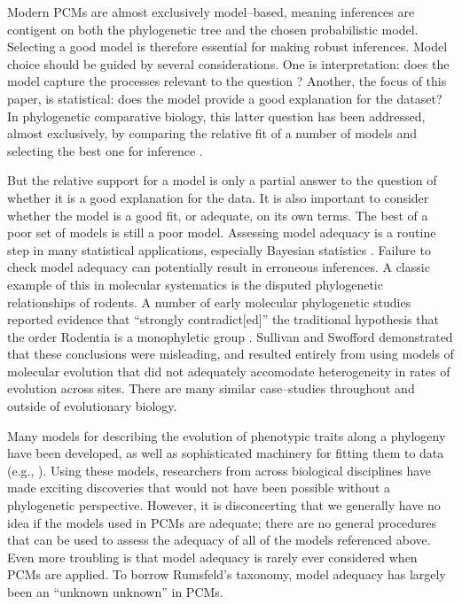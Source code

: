 \documentclass[a4paper,12pt]{article}
\begin{document}
Modern PCMs are almost exclusively model--based, meaning inferences are contigent on both the phylogenetic tree and the chosen probabilistic model. Selecting a good model is therefore essential for making robust inferences. Model choice should be guided by several considerations. One is interpretation: does the model capture the processes relevant to the question \citep{HansenOrzack2005, Hansen2012, PennellPE}? Another, the focus of this paper, is statistical: does the model provide a good explanation for the dataset? In phylogenetic comparative biology, this latter question has been addressed, almost exclusively, by comparing the relative fit of a number of models and selecting the best one for inference \citep{Mooers1999, Harmon2010, Hunt2012}. 

But the relative support for a model is only a partial answer to the question of whether it is a good explanation for the data. It is also important to consider whether the model is a good fit, or adequate, on its own terms. The best of a poor set of models is still a poor model. Assessing model adequacy is a routine step in many statistical applications, especially Bayesian statistics \citep{Gelmanbook}. Failure to check model adequacy can potentially result in erroneous inferences. A classic example of this in molecular systematics is the disputed phylogenetic relationships of rodents. A number of early molecular phylogenetic studies reported evidence that ``strongly contradict[ed]'' the traditional hypothesis that the order Rodentia is a monophyletic group \citep{Graur1991, DErchia1996}. Sullivan and Swofford \citep{SullivanSwofford} demonstrated that these conclusions were misleading, and resulted entirely from using models of molecular evolution that did not adequately accomodate  heterogeneity in rates of evolution across sites. There are many similar case--studies throughout and outside of evolutionary biology.

Many models for describing the evolution of phenotypic traits along a phylogeny have been developed, as well as sophisticated machinery for fitting them to data (e.g., \citep{Felsenstein1985, Hansen1997, Pagel1999, Blomberg2003, ButlerKing2004, Omeara2006, Eastman2011, Beaulieu2012, SlaterMEE, UyedaBayou}). Using these models, researchers from across biological disciplines have made exciting discoveries that would not have been possible without a phylogenetic perspective. However, it is disconcerting that we generally have no idea if the models used in PCMs are adequate; there are no general procedures that can be used to assess the adequacy of all of the models referenced above. Even more troubling is that model adequacy is rarely ever considered when PCMs are applied. To borrow Rumsfeld's taxonomy, model adequacy has largely been an ``unknown unknown'' in PCMs.
\end{document}
